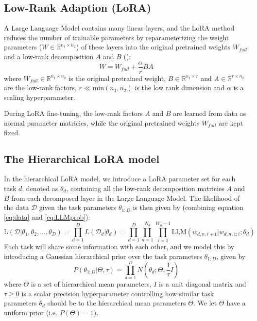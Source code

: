 \documentclass{article}
\newcommand{\R}{\mathbb{R}}
\begin{document}
\subsection{Low-Rank Adaption (LoRA)}
A Large Language Model contains many linear layers, and the LoRA method reduces the number of trainable parameters by reparameterizing the weight parameters ($W \in \R^{n_1 \times n_2}$) of these layers into the original pretrained weights $W_{full}$ and a low-rank decomposition $A$ and $B$ (\cite{hayou_lora_2024}):
\begin{equation} \label{eq:LoRA}
    W = W_{full} + \frac{\alpha}{r} BA 
\end{equation}
%
where $W_{full} \in \R^{n_1 \times n_2}$ is the original pretrained weight, $B \in \R^{n_1 \times r}$ and $A \in \R^{r \times n_2}$ are the low-rank factors, $r \ll \text{min}(n_1, n_2)$ is the low rank dimension and $\alpha$ is a scaling hyperparameter.

During LoRA fine-tuning, the low-rank factors $A$ and $B$ are learned from data as normal parameter matricies, while the original pretrained weights $W_{full}$ are kept fixed.

\subsection{The Hierarchical LoRA model}
In the hierarchical LoRA model, we introduce a LoRA parameter set for each task $d$, denoted as $\theta_d$, containing all the low-rank decomposition matricies $A$ and $B$ from each decomposed layer in the Large Language Model. The likelihood of the data $\mathcal{D}$ given the task parameters $\theta_{1:D}$ is then given by (combining equation \ref{eq:data} and \ref{eq:LLMprob}):
\begin{equation} \label{eq:lik}
    \text{L}(\mathcal{D} | \theta_1, \theta_2, \ldots, \theta_D) = \prod_{d=1}^D L(\mathcal{D}_d | \theta_d) = \prod_{d=1}^D \prod_{n=1}^{N_d} \prod_{i=1}^{W_n-1} \text{LLM}(w_{d,n,i+1} | w_{d,n,1:i}; \theta_d)
\end{equation}
%
%
Each task will share some information with each other, and we model this by introducing a Gaussian hierarchical prior over the task parameters $\theta_{1:D}$, given by
\begin{equation} \label{eq:prior}
    P(\theta_{1:D} | \Theta, \tau ) = \prod_{d=1}^D N(\theta_d ; \Theta, \frac{1}{\tau} I)
\end{equation}
%
where $\Theta$ is a set of hierarchical mean parameters, $I$ is a unit diagonal matrix and $\tau \geq 0$ is a scalar precision hyperparameter controlling how similar task parameters $\theta_d$ should be to the hierarchical mean parameters $\Theta$.
We let $\Theta$ have a uniform prior (i.e. $P(\Theta) = 1$).
\end{document}
